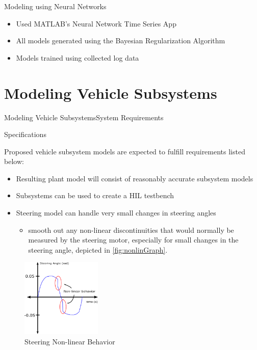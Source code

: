 \documentclass{beamer}
\begin{document}
\begin{frame}{Modeling using Neural Networks}{}
	\begin{block}{}
 \begin{itemize}
        \item Used MATLAB's Neural Network Time Series App 
        \item All models generated using the Bayesian Regularization Algorithm 
        \item Models trained using collected log data 
\end{itemize}
  \end{block}
\end{frame}

\section{Modeling Vehicle Subsystems}

\begin{frame}{Modeling Vehicle Subsystems}{System Requirements}
	\begin{block}{Specifications}
	\begin{minipage}[t]{0.62\linewidth}    
    Proposed vehicle subsystem models are expected to fulfill requirements listed below:
	\begin{itemize}
    		\item Resulting plant model will consist of reasonably accurate subsystem models
    		\item Subsystems can be used to create a HIL testbench
    		\item Steering model can handle very small changes in steering angles
    \begin{itemize}
		\item smooth out any non-linear discontinuities that would normally be measured by the steering motor, especially for small changes in the steering angle, depicted in \autoref{fig:nonlinGraph}.
    \end{itemize}
	\end{itemize}
	\end{minipage}
	\begin{minipage}[t]{0.34\linewidth}
	\begin{figure}[h]
		\centering
    		\captionsetup{justification=centering, margin=0.5cm}
    		\includegraphics[width=1.5in]{figs/inkscape/nonlinearBehavior}
    		\caption{Steering Non-linear Behavior}
    		\label{fig:nonlinGraph}
	\end{figure}
	\end{minipage}
\end{block}
\end{frame}
\end{document}
